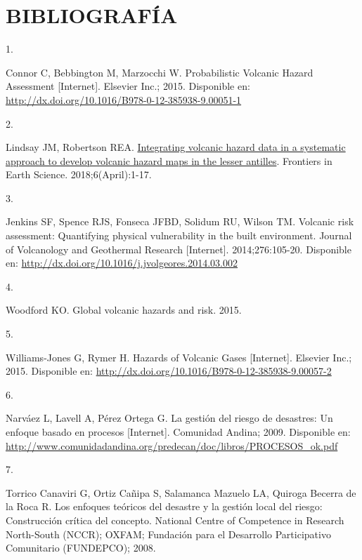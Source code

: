 \documentclass[
  spanish,
  letterpaper,
]{book}
\newlength{\cslhangindent}
\newlength{\csllabelwidth}
\newenvironment{CSLReferences}[2] %
 {\begin{list}{}{%
  \setlength{\itemindent}{0pt}
  \setlength{\leftmargin}{0pt}
  \setlength{\parsep}{0pt}
  \ifodd #1
   \setlength{\leftmargin}{\cslhangindent}
   \setlength{\itemindent}{-1\cslhangindent}
  \fi
  \setlength{\itemsep}{#2\baselineskip}}}
 {\end{list}}
\newcommand{\CSLLeftMargin}[1]{\parbox[t]{\csllabelwidth}{\strut#1\strut}}
\newcommand{\CSLRightInline}[1]{\parbox[t]{\linewidth - \csllabelwidth}{\strut#1\strut}}
\begin{document}
\chapter{BIBLIOGRAFÍA}\label{bibliografuxeda}

\label{refs}
\begin{CSLReferences}{0}{1}
\CSLLeftMargin{1. }%
\CSLRightInline{Connor C, Bebbington M, Marzocchi W. Probabilistic
Volcanic Hazard Assessment {[}Internet{]}. Elsevier Inc.; 2015.
Disponible en:
\url{http://dx.doi.org/10.1016/B978-0-12-385938-9.00051-1}}

\CSLLeftMargin{2. }%
\CSLRightInline{Lindsay JM, Robertson REA.
\href{https://doi.org/10.3389/feart.2018.00042}{Integrating volcanic
hazard data in a systematic approach to develop volcanic hazard maps in
the lesser antilles}. Frontiers in Earth Science. 2018;6(April):1-17. }

\CSLLeftMargin{3. }%
\CSLRightInline{Jenkins SF, Spence RJS, Fonseca JFBD, Solidum RU, Wilson
TM. Volcanic risk assessment: Quantifying physical vulnerability in the
built environment. Journal of Volcanology and Geothermal Research
{[}Internet{]}. 2014;276:105-20. Disponible en:
\url{http://dx.doi.org/10.1016/j.jvolgeores.2014.03.002}}

\CSLLeftMargin{4. }%
\CSLRightInline{Woodford KO. Global volcanic hazards and risk. 2015. }

\CSLLeftMargin{5. }%
\CSLRightInline{Williams-Jones G, Rymer H. Hazards of Volcanic Gases
{[}Internet{]}. Elsevier Inc.; 2015. Disponible en:
\url{http://dx.doi.org/10.1016/B978-0-12-385938-9.00057-2}}

\CSLLeftMargin{6. }%
\CSLRightInline{Narváez L, Lavell A, Pérez Ortega G. La gestión del
riesgo de desastres: Un enfoque basado en procesos {[}Internet{]}.
Comunidad Andina; 2009. Disponible en:
\url{http://www.comunidadandina.org/predecan/doc/libros/PROCESOS_ok.pdf}}

\CSLLeftMargin{7. }%
\CSLRightInline{Torrico Canaviri G, Ortiz Cañipa S, Salamanca Mazuelo
LA, Quiroga Becerra de la Roca R. Los enfoques teóricos del desastre y
la gestión local del riesgo: Construcción crítica del concepto. National
Centre of Competence in Research North-South (NCCR); OXFAM; Fundación
para el Desarrollo Participativo Comunitario (FUNDEPCO); 2008. }


\end{CSLReferences}
\end{document}
